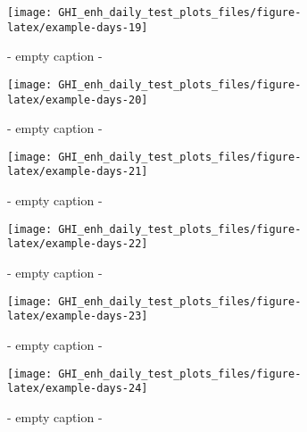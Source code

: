 \documentclass[
  10pt,
  a4paper,oneside]{article}
\begin{document}
\begin{figure}[H]

{\centering \texttt{[image: GHI\_enh\_daily\_test\_plots\_files/figure-latex/example-days-19]} 

}

\caption{ - empty caption - }\label{fig:example-days-19}
\end{figure}

\begin{figure}[H]

{\centering \texttt{[image: GHI\_enh\_daily\_test\_plots\_files/figure-latex/example-days-20]} 

}

\caption{ - empty caption - }\label{fig:example-days-20}
\end{figure}

\begin{figure}[H]

{\centering \texttt{[image: GHI\_enh\_daily\_test\_plots\_files/figure-latex/example-days-21]} 

}

\caption{ - empty caption - }\label{fig:example-days-21}
\end{figure}

\begin{figure}[H]

{\centering \texttt{[image: GHI\_enh\_daily\_test\_plots\_files/figure-latex/example-days-22]} 

}

\caption{ - empty caption - }\label{fig:example-days-22}
\end{figure}

\begin{figure}[H]

{\centering \texttt{[image: GHI\_enh\_daily\_test\_plots\_files/figure-latex/example-days-23]} 

}

\caption{ - empty caption - }\label{fig:example-days-23}
\end{figure}

\begin{figure}[H]

{\centering \texttt{[image: GHI\_enh\_daily\_test\_plots\_files/figure-latex/example-days-24]} 

}

\caption{ - empty caption - }\label{fig:example-days-24}
\end{figure}
\end{document}
